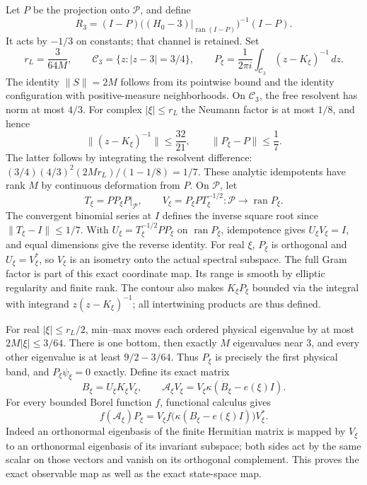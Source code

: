 \documentclass[
  11pt,
]{article}
\begin{document}
Let \(P\) be the projection onto \(\mathcal P\), and define \[
 R_3=(I-P)\bigl((H_0-3)|_{\operatorname{ran}(I-P)}\bigr)^{-1}(I-P).
\tag{2.2}
\] It acts by \(-1/3\) on constants; that channel is retained. Set \[
 r_L=\frac3{64M},\qquad \mathcal C_3=\{z:|z-3|=3/4\},\qquad
 P_\xi=\frac1{2\pi i}\int_{\mathcal C_3}(z-K_\xi)^{-1}\,dz.
\tag{2.3}
\] The identity \(\|S\|=2M\) follows from its pointwise bound and the
identity configuration with positive-measure neighborhoods. On
\(\mathcal C_3\), the free resolvent has norm at most \(4/3\). For
complex \(|\xi|\le r_L\) the Neumann factor is at most \(1/8\), and
hence \[
 \|(z-K_\xi)^{-1}\|\le\frac{32}{21},\qquad
 \|P_\xi-P\|\le\frac17.
\tag{2.4}
\] The latter follows by integrating the resolvent difference:
\((3/4)(4/3)^2(2Mr_L)/(1-1/8)=1/7\). These analytic idempotents have
rank \(M\) by continuous deformation from \(P\). On \(\mathcal P\), let
\[
 T_\xi=PP_\xi P|_{\mathcal P},\qquad
 V_\xi=P_\xi P T_\xi^{-1/2}:\mathcal P\longrightarrow\operatorname{ran}P_\xi.
\tag{2.5}
\] The convergent binomial series at \(I\) defines the inverse square
root since \(\|T_\xi-I\|\le1/7\). With \(U_\xi=T_\xi^{-1/2}PP_\xi\) on
\(\operatorname{ran}P_\xi\), idempotence gives \(U_\xi V_\xi=I\), and
equal dimensions give the reverse identity. For real \(\xi\), \(P_\xi\)
is orthogonal and \(U_\xi=V_\xi^*\), so \(V_\xi\) is an isometry onto
the actual spectral subspace. The full Gram factor is part of this exact
coordinate map. Its range is smooth by elliptic regularity and finite
rank. The contour also makes \(K_\xi P_\xi\) bounded via the integral
with integrand \(z(z-K_\xi)^{-1}\); all intertwining products are thus
defined.

For real \(|\xi|\le r_L/2\), min--max moves each ordered physical
eigenvalue by at most \(2M|\xi|\le3/64\). There is one bottom, then
exactly \(M\) eigenvalues near 3, and every other eigenvalue is at least
\(9/2-3/64\). Thus \(P_\xi\) is precisely the first physical band, and
\(P_\xi\psi_\xi=0\) exactly. Define its exact matrix \[
 B_\xi=U_\xi K_\xi V_\xi,
 \qquad \mathscr A_\xi V_\xi
      =V_\xi\kappa(B_\xi-e(\xi)I).
\tag{2.6}
\] For every bounded Borel function \(f\), functional calculus gives \[
 f(\mathscr A_\xi)P_\xi
 =V_\xi f\bigl(\kappa(B_\xi-e(\xi)I)\bigr)V_\xi^*.
\tag{2.7}
\] Indeed an orthonormal eigenbasis of the finite Hermitian matrix is
mapped by \(V_\xi\) to an orthonormal eigenbasis of its invariant
subspace; both sides act by the same scalar on those vectors and vanish
on its orthogonal complement. This proves the exact observable map as
well as the exact state-space map.
\end{document}
